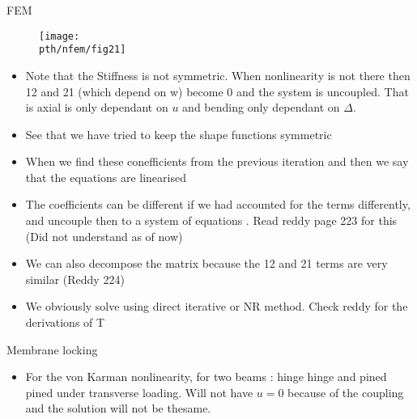 	\begin{frame}{FEM}
		\begin{figure}
			\centering
			\texttt{[image: \\pth/nfem/fig21]} 		
		\end{figure}
	\end{frame}


	\begin{frame}
		\begin{itemize}
			\item Note that the Stiffness is not symmetric. When nonlinearity is not there then 12 and 21 (which depend on w) become 0 and the system is uncoupled. That is axial is only dependant on $u$ and bending only dependant on $\Delta$.
			\item See that we have tried to keep the shape functions symmetric
			\item When we find these conefficients from the previous iteration and then we say that the equations are linearised
			\item  The coefficients can be different if we had accounted for the terms differently, and uncouple then to a system of equations . Read reddy page 223 for this (Did not understand as of now)
			\item  We can also decompose the matrix because the 12 and 21 terms are very similar (Reddy 224)
			\item We obviously solve using direct iterative or NR method. Check reddy for the derivations of T 
		\end{itemize}
	\end{frame}


	\begin{frame}{Membrane locking}
		\begin{itemize}
			\item For the von Karman nonlinearity, for two beams : hinge hinge and pined pined under transverse loading. Will not have $u = 0$ because of the coupling and the solution will not be thesame. 
			
		\end{itemize}
	\end{frame}